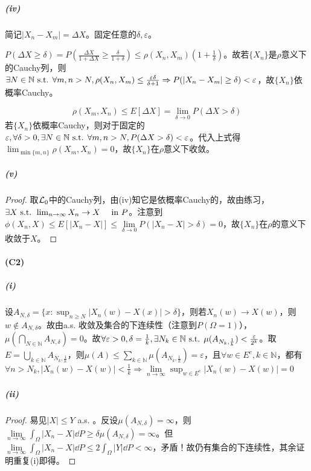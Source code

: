\documentclass{ctexart}
\begin{document}
\subparagraph{(iv)}
简记$|X_{n}-X_{m}|=\Delta X$。固定任意的$\delta,\varepsilon$。

$P(\Delta X\geq \delta)=P(\frac{\Delta X}{1+\Delta X}\geq \frac{\delta}{1+\delta})\leq \rho(X_{n},X_{m})(1+\frac{1}{\delta})$。故若$\{X_{n}\}$是$\rho$意义下的Cauchy列，则$\exists N\in\mathbb{N}\text{ s.t. } \forall m,n>N, \rho(X_{n},X_{m})\leq \frac{\varepsilon\delta}{\delta+1}\Rightarrow P(|X_{n}-X_{m}|\geq \delta)<\varepsilon$，故$\{X_{n}\}$依概率Cauchy。

\[\rho(X_{m},X_{n})\leq E[\Delta X]=\lim_{\delta\to 0}P(\Delta X>\delta)\]
若$\{X_{n}\}$依概率Cauchy，则对于固定的$\varepsilon,\forall \delta>0,\exists N\in\mathbb{N}\text{ s.t. } \forall m,n>N, P(\Delta X>\delta)<\varepsilon$。代入上式得$\lim_{\min\{m,n\}}\rho(X_{m},X_{n})=0$，故$\{X_{n}\}$在$\rho$意义下收敛。

\subparagraph{(v)}
\begin{proof}
  取$\mathcal{L}_{0}$中的Cauchy列，由(iv)知它是依概率Cauchy的，故由练习，$\exists X\text{ s.t. } \lim_{n\to\infty}X_{n}\to X\quad \text{ in } P$。注意到$\phi(X_{n},X)\leq E[|X_{n}-X|]\leq \lim\limits_{\delta\to 0}P(|X_{n}-X|>\delta)=0$，故$\{X_{n}\}$在$\rho$的意义下收敛于$X$。
\end{proof}

\paragraph{(C2)}
\subparagraph{(i)}
设$A_{N,\delta}=\{x: \sup_{n\geq N}|X_{n}(w)-X(x)|>\delta\}$，则若$X_{n}(w)\to X(w)$，则$w\not \in A_{N,\delta}$。故由a.s. 收敛及集合的下连续性（注意到$P(\Omega=1)$），$\mu(\bigcap\limits_{N\in\mathbb{N}}A_{N,\delta})=0$。故$\forall\varepsilon>0, \delta=\frac{1}{k},\exists N_{k}\in\mathbb{N}\text{ s.t. } \mu(A_{N_{k},\frac{1}{k}})<\frac{\varepsilon}{2^{k}}$。取$E=\bigcup\limits_{k\in\mathbb{N}}A_{N_{k},\frac{1}{k}}$，则$\mu(A)\leq\sum\limits_{k\in\mathbb{N}}\mu(A_{N_{k},\frac{1}{k}})=\varepsilon$，且$\forall w\in E^{c}, k\in\mathbb{N}$，都有$\forall n>N_{k}, |X_{n}(w)-X(w)|<\frac{1}{k}\Rightarrow \lim\limits_{n\to\infty}\sup_{w\in E^{c}}|X_{n}(w)-X(w)|=0$

\subparagraph{(ii)}
\begin{proof}
  易见$|X|\leq Y$ a.s. 。反设$\mu(A_{N,\delta})=\infty$，则$\lim\limits_{n\to\infty}\int_{\Omega}|X_{n}-X|\dd P\geq \delta\mu(A_{N,\delta})=\infty$。但$\lim\limits_{n\to\infty}\int_{\Omega}|X_{n}-X|\dd P\leq 2\int_{\Omega}|Y|\dd P<\infty$，矛盾！故仍有集合的下连续性，其余证明重复(i)即得。
\end{proof}
\end{document}
